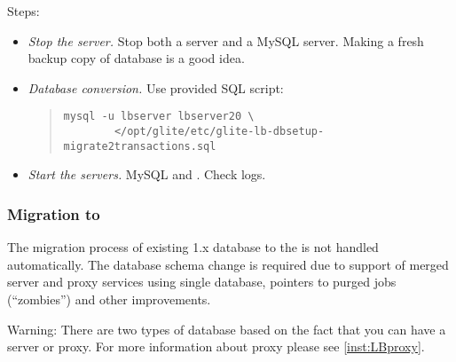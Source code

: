 Steps:
\begin{itemize}
 \item \emph{Stop the server.} Stop both a \LB server and a MySQL
 server. Making a fresh backup copy of database is a good idea.
 \item \emph{Database conversion.} Use provided SQL script:
  \begin{quote}
   \begin{verbatim}
mysql -u lbserver lbserver20 \
        </opt/glite/etc/glite-lb-dbsetup-migrate2transactions.sql
   \end{verbatim}
  \end{quote}
 \item \emph{Start the servers.} MySQL and \LB. Check logs.
\end{itemize}


\subsubsection{Migration to }
\label{inst:migrate20}
The migration process of existing \LB 1.x database to the  is
not handled automatically. The database schema change is required due
to support of merged \LB server and proxy services using single
database, pointers to purged jobs (``zombies'') and other
improvements.

Warning: There are two types of \LB database based on the fact that
you can have a \LB server or \LB proxy. For more information about \LB
proxy please see \ref{inst:LBproxy}.

